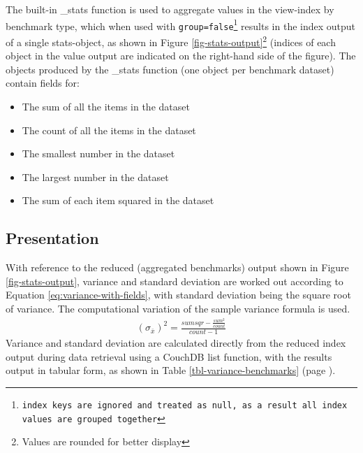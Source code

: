 The built-in \_stats function is used to aggregate values in the view-index by benchmark type, which when used with \texttt{group=false\footnote{index keys are ignored and treated as \texttt{null}, as a result all index values are grouped together}} results in the index output of a single stats-object, as shown in Figure \ref{fig-stats-output}\footnote{Values are rounded for better display} (indices of each object in the value output are indicated on the right-hand side of the figure). The objects produced by the \_stats function (one object per benchmark dataset) contain fields for:

\begin{itemize}
    \item The sum of all the items in the dataset
    \item The count of all the items in the dataset
    \item The smallest number in the dataset
    \item The largest number in the dataset
    \item The sum of each item squared in the dataset
\end{itemize}



\subsection{Presentation}
With reference to the reduced (aggregated benchmarks) output shown in Figure \ref{fig-stats-output}, variance and standard deviation are worked out according to Equation \ref{eq:variance-with-fields}, with standard deviation being the square root of variance. The computational variation of the sample variance formula is used.
\begin{align}
    (\sigma_{\overline{x}})^{2} =  \frac{sumsqr - \frac{sum^2}{count}}{count - 1}\label{eq:variance-with-fields}
\end{align}
Variance and standard deviation are calculated directly from the reduced index output during data retrieval using a CouchDB list function, with the results output in tabular form, as shown in Table \ref{tbl-variance-benchmarks} (page \pageref{tbl-variance-benchmarks}).